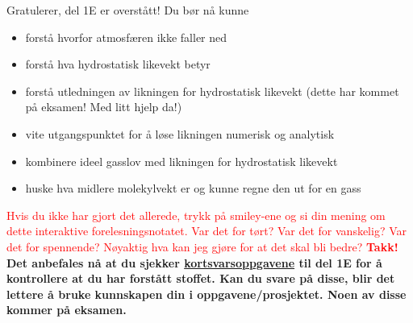 \documentclass{beamer}
\let\hrefori\href
\renewcommand{\href}[2]{{\setlength{\fboxsep}{1pt}\colorbox{sunset}{\hrefori{#1}{#2}}}}
\newcommand{\pagebutton}[1]{\setbeamertemplate{button}{\tikz\node[inner xsep = 5pt, draw = structure!90, fill = green(ryb), rounded corners = 8pt]{\color{amber}\Large\insertbuttontext};}\beamerbutton{#1}}
\begin{document}
\begin{frame}
\label{oppsummering}
\hyperlink{hydrostat21}{\pagebutton{\small Forrige side}}\href{https://nettskjema.no/a/160340}{ \Changey[1][yellow]{-2}}
Gratulerer, del 1E er overstått! Du bør nå kunne
\begin{itemize}
\item forstå hvorfor atmosfæren ikke faller ned
\item forstå hva hydrostatisk likevekt betyr
\item forstå utledningen av likningen for hydrostatisk likevekt (dette har kommet på eksamen! Med litt hjelp da!)
\item vite utgangspunktet for å løse likningen numerisk og analytisk
\item kombinere ideel gasslov med likningen for hydrostatisk likevekt
\item huske hva midlere molekylvekt er og kunne regne den ut for en gass
\end{itemize}
\textcolor{red}{Hvis du ikke har gjort det allerede, trykk på smiley-ene og si din mening om dette interaktive forelesningsnotatet. Var det for tørt? Var det for vanskelig? Var det for spennende? Nøyaktig hva kan jeg gjøre for at det skal bli bedre? {\bf Takk!}}
{\bf Det anbefales nå at du sjekker \href{https://www.uio.no/studier/emner/matnat/astro/AST2000/h21/undervisningsmateriell/kortsvarsoppgaver/del1e.pdf}{kortsvarsoppgavene} til del 1E for å kontrollere at du har forstått stoffet. Kan du svare på disse, blir det lettere å bruke kunnskapen din i oppgavene/prosjektet. Noen av disse kommer på eksamen.}\\
\end{frame}
\end{document}

